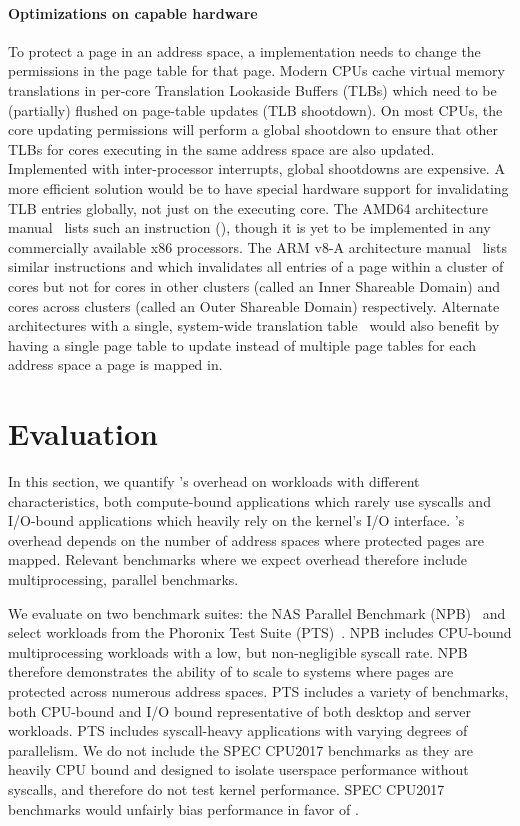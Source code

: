 \documentclass[letterpaper,twocolumn,10pt, anonymous]{article}
\begin{document}
\paragraph{Optimizations on capable hardware}
To protect a page in an address space, a \tiktok implementation 
needs to change the permissions in the page table for that page.
Modern CPUs cache virtual memory translations in per-core 
Translation Lookaside Buffers (TLBs) which need to be (partially) 
flushed on page-table updates (TLB shootdown).
On most CPUs, the core updating permissions will perform a global 
shootdown to ensure that other TLBs for cores executing in the 
same address space are also updated.
Implemented with inter-processor interrupts, global shootdowns 
are expensive. 
A more efficient solution would be to have special hardware support
for invalidating TLB entries globally, not just on the executing 
core. 
The AMD64 architecture manual~\cite{amd64prog} lists such an instruction 
(), though it is yet to be implemented in any commercially 
available x86 processors.
The ARM v8-A architecture manual~\cite{armv8a} lists similar instructions 
 and  which invalidates all entries 
of a page within a cluster of cores but not for cores in other clusters
(called an Inner Shareable Domain) and cores across clusters (called an 
Outer Shareable Domain) respectively.
Alternate architectures with a single, system-wide translation 
table~\cite{guptarebooting,ChaseLFL94} 
would also benefit \tiktok by having a single page table to 
update instead of multiple page tables for each address space a page
is mapped in.


\section{Evaluation}
In this section, we quantify \tiktok's overhead on workloads 
with different characteristics, both compute-bound applications
which rarely use syscalls and I/O-bound applications which 
heavily rely on the kernel's I/O interface.
\tiktok's overhead depends on the number of address spaces 
where protected pages are mapped. 
Relevant benchmarks where we expect overhead therefore include multiprocessing,
parallel benchmarks.

We evaluate \tiktok on two benchmark suites: the NAS Parallel 
Benchmark (NPB)~\cite{npb} and select workloads from the 
Phoronix Test Suite (PTS)~\cite{pts}. 
NPB includes CPU-bound multiprocessing workloads with a 
low, but non-negligible syscall rate. 
NPB therefore demonstrates the ability of \tiktok to 
scale to systems where pages are protected across numerous 
address spaces.
PTS includes a variety of benchmarks, both CPU-bound and 
I/O bound representative of both desktop and server workloads.
PTS includes syscall-heavy applications with varying degrees 
of parallelism.
We do not include the SPEC CPU2017 benchmarks
as they are heavily CPU bound and designed to isolate userspace 
performance without syscalls, and therefore do not test kernel 
performance. SPEC CPU2017 benchmarks would unfairly bias performance in favor of
\tiktok.
\end{document}
